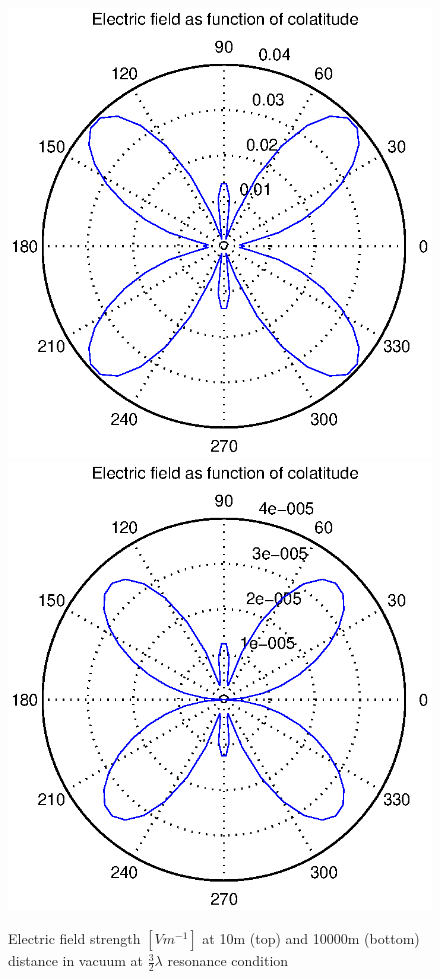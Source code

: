 \documentclass[a4paper,11pt]{thesis}
\begin{document}
\begin{figure}
\begin{center}
  \includegraphics[width=11.5cm]{DissPics/NFvac10m3halbelambdaMHz.eps}
\includegraphics[width=11.5cm]{DissPics/NFvac10000m3halbelambdaMHz.eps}
  \caption{Electric field strength $[Vm^{-1}]$ at 10m (top) and 10000m (bottom) distance in vacuum at $\frac{3}{2}\lambda$ resonance condition}\label{figNFvac10m3halbelambdaMHz}
  \end{center}
\end{figure}
\end{document}
